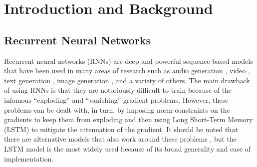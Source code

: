 \documentclass[conference]{IEEEtran}
\begin{document}
\section{Introduction and Background}
\subsection{Recurrent Neural Networks}
Recurrent neural networks (RNNs) are deep and powerful sequence-based models that have been used
in many areas of research such as audio generation \cite{b5} \cite{b4}, video \cite{b3}, text
generation \cite{b6}, image generation \cite{b7}, and a variety of others. The main drawback of
using RNNs is that they are notoriously difficult to train because of the infamous ``exploding''
\cite{b9} and ``vanishing'' \cite{b10} gradient problems. However, these problems can be dealt
with, in turn, by imposing norm-constraints on the gradients to keep them from exploding and then
using Long Short-Term Memory (LSTM) \cite{b8} to mitigate the attenuation of the gradient. It
should be noted that there are alternative models that also work around these problems \cite{b11}
\cite{b12} \cite{b15}, but the LSTM model is the most widely used because of its broad generality
and ease of implementation.
\end{document}
